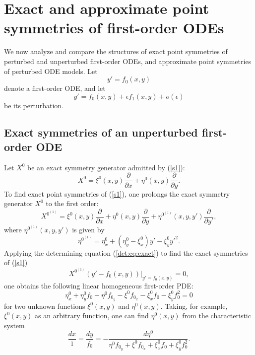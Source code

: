 \documentclass[11pt,letter,subeqn]{article}
\begin{document}
\section{Exact and approximate point symmetries of first-order ODEs}\label{sec:1stODEs}

We now analyze and compare the structures of exact point symmetries of perturbed and unperturbed first-order ODEs, and approximate point symmetries of perturbed ODE models. Let
\begin{equation}\label{s1}
  y'=f_0(x,y)
\end{equation}
denote a first-order ODE, and let
\begin{equation}\label{s2}
  y'=f_0(x,y)+\epsilon f_1(x,y)+o(\epsilon)
\end{equation}
be its perturbation.

\subsection{Exact symmetries of an unperturbed first-order ODE }
  Let $X^0$ be an exact symmetry generator admitted by (\ref{s1}):
  \begin{equation}\label{eq25}
     X^0=\xi^0(x,y)\dfrac{\partial}{\partial x}+ \eta^0(x,y) \dfrac{\partial}{\partial y}.
  \end{equation}
  To find exact point symmetries of (\ref{s1}), one prolongs the exact symmetry generator $X^0$ to the first order:
  \begin{equation}
    X^{0^{(1)}}=\xi^0(x,y)\dfrac{\partial}{\partial x}+ \eta^0(x,y) \dfrac{\partial}{\partial y}+ \eta^{0^{(1)}}(x,y,y') \dfrac{\partial}{\partial y'},
  \end{equation}
  where $\eta^{0^{(1)}}(x,y,y')$ is given by
  \begin{equation}
    \eta^{0^{(1)}}=\eta^0_x+(\eta^0_y-\xi^0_x)y'-\xi^0_y{y'}^{2}.
  \end{equation}
  Applying the determining equation (\ref{det:eq:exact}) to find the exact symmetries of (\ref{s1})
  \[
     X^{0^{(1)}}(y'-f_0(x,y))\bigg|_{y'=f_0(x,y)}=0,
  \]
  one obtains the following linear homogeneous first-order PDE:
  \begin{equation}\label{w3}
    \eta^0_x+\eta^0_yf_0-\eta^0 f_{0_y}-\xi^0f_{0_x}-\xi^0_xf_0-\xi^0_yf_0^2=0
  \end{equation}
 for two unknown functions $\xi^0(x,y)$ and $\eta^0(x,y)$. Taking, for example, $\xi^0(x,y)$ as an arbitrary function, one can find $\eta^0(x,y)$
  from the characteristic system
  \begin{equation}\label{b1}
    \dfrac{dx}{1}=\dfrac{dy}{f_0}=-\dfrac{d \eta^0}{\eta^0 f_{0_y}+\xi^0f_{0_x}+\xi^0_xf_0+\xi^0_yf_0^2}.
  \end{equation}
\end{document}
